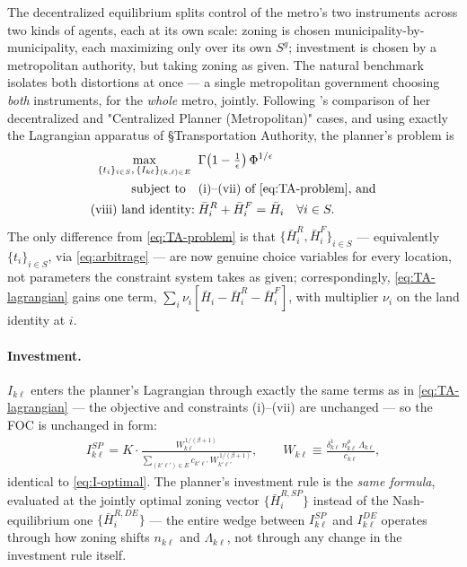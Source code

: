 \documentclass[12pt, a4paper]{article}
\theoremstyle{definition}
\theoremstyle{remark}
\begin{document}
The decentralized equilibrium splits control of the metro's two instruments across two kinds of agents, each at its own scale: zoning is chosen municipality-by-municipality, each maximizing only over its own $S^g$; investment is chosen by a metropolitan authority, but taking zoning as given. The natural benchmark isolates both distortions at once — a single metropolitan government choosing \emph{both} instruments, for the \emph{whole} metro, jointly. Following \citet{Bordeu2026-df}'s comparison of her decentralized and "Centralized Planner (Metropolitan)" cases, and using exactly the Lagrangian apparatus of \S Transportation Authority, the planner's problem is
\begin{align}
    \label{eq:SP-problem}
\max_{\{t_i\}_{i\in S},\,\{I_{k\ell}\}_{(k,\ell)\in E}}\;\; & \Gamma\!\left(1 - \tfrac{1}{\epsilon}\right)\Phi^{1/\epsilon} \\
\text{subject to} \quad & \text{(i)--(vii) of \eqref{eq:TA-problem}, and} \nonumber\\
\text{(viii) land identity:}\; & \bar H_i^R + \bar H_i^F = \bar H_i \quad \forall i\in S. \nonumber
\end{align}
The only difference from \eqref{eq:TA-problem} is that $\{\bar H_i^R,\bar H_i^F\}_{i\in S}$ — equivalently $\{t_i\}_{i\in S}$, via \eqref{eq:arbitrage} — are now genuine choice variables for every location, not parameters the constraint system takes as given; correspondingly, \eqref{eq:TA-lagrangian} gains one term, $\sum_i\nu_i[\bar H_i-\bar H_i^R-\bar H_i^F]$, with multiplier $\nu_i$ on the land identity at $i$.

\paragraph{Investment.} $I_{k\ell}$ enters the planner's Lagrangian through exactly the same terms as in \eqref{eq:TA-lagrangian} — the objective and constraints (i)–(vii) are unchanged — so the FOC is unchanged in form:
\begin{align}
    \label{eq:I-optimal-SP}
I_{k\ell}^{SP} = K\cdot\frac{W_{k\ell}^{\,1/(\beta+1)}}{\displaystyle\sum_{(k'\ell')\in E}c_{k'\ell'}\,W_{k'\ell'}^{\,1/(\beta+1)}}, \qquad W_{k\ell}\equiv\frac{\delta_{k\ell}^1\,n_{k\ell}^\rho\,\Lambda_{k\ell}}{c_{k\ell}},
\end{align}
identical to \eqref{eq:I-optimal}. The planner's investment rule is the \emph{same formula}, evaluated at the jointly optimal zoning vector $\{\bar H_i^{R,SP}\}$ instead of the Nash-equilibrium one $\{\bar H_i^{R,DE}\}$ — the entire wedge between $I_{k\ell}^{SP}$ and $I_{k\ell}^{DE}$ operates through how zoning shifts $n_{k\ell}$ and $\Lambda_{k\ell}$, not through any change in the investment rule itself.
\end{document}
